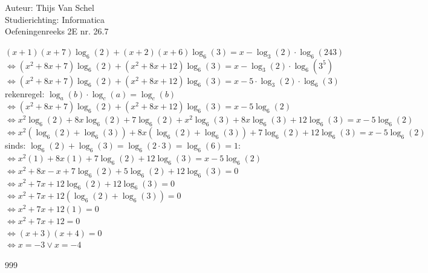 \documentclass[a4paper]{article}
\begin{document}
  
\noindent \large Auteur: Thijs Van Schel\\
\noindent \large Studierichting: Informatica\\
\noindent \large Oefeningenreeks 2E nr. 26.7\\

\medskip
\normalsize

$(x+1)(x+7)\log_6(2) + (x+2)(x+6)\log_6(3) = x-\log_3(2) \cdot \log_6(243)$\\

$\Leftrightarrow (x^2+8x+7)\log_6(2) + (x^2+8x+12)\log_6(3) = x-\log_3(2) \cdot \log_6(3^5)$\\

$\Leftrightarrow (x^2+8x+7)\log_6(2) + (x^2+8x+12)\log_6(3) = x-5 \cdot \log_3(2) \cdot \log_6(3)$\\

rekenregel: $\log_a(b) \cdot \log_c(a) = \log_c(b)$\\

$\Leftrightarrow (x^2+8x+7)\log_6(2) + (x^2+8x+12)\log_6(3) = x-5\log_6(2)$\\

$\Leftrightarrow x^2\log_6(2) + 8x\log_6(2) + 7\log_6(2) + x^2\log_6(3) + 8x\log_6(3) + 12\log_6(3) = x-5\log_6(2)$\\

$\Leftrightarrow x^2(\log_6(2) + \log_6(3)) + 8x(\log_6(2) + \log_6(3)) + 7\log_6(2) + 12\log_6(3) = x-5\log_6(2)$\\

sinds: $\log_6(2) + \log_6(3) = \log_6(2 \cdot 3) = \log_6(6) = 1$:\\

$\Leftrightarrow x^2(1) + 8x(1) + 7\log_6(2) + 12\log_6(3) = x-5\log_6(2)$\\

$\Leftrightarrow x^2 + 8x - x + 7\log_6(2) + 5\log_6(2) + 12\log_6(3) = 0$\\

$\Leftrightarrow x^2 + 7x + 12\log_6(2) + 12\log_6(3) = 0$\\

$\Leftrightarrow x^2 + 7x + 12(\log_6(2) + \log_6(3)) = 0$\\

$\Leftrightarrow x^2 + 7x + 12(1) = 0$\\

$\Leftrightarrow x^2 + 7x + 12 = 0$\\

$\Leftrightarrow (x+3)(x+4) = 0$\\

$\Leftrightarrow x = -3 \lor x = -4$\\

\begin{thebibliography}{999}
\end{thebibliography}
\end{document}
